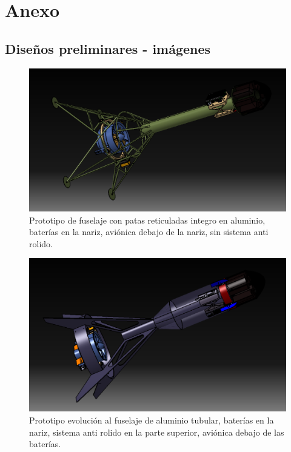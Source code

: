 \null\newpage
\clearpage

\section{Anexo}

\subsection{Diseños preliminares - imágenes}

\begin{figure}[htb]
    \centering
    \includegraphics[height=0.25\pdfpageheight]{fig/design/0}
    \caption{Prototipo de fuselaje con patas reticuladas integro en aluminio, baterías en la nariz, aviónica debajo de la nariz, sin sistema anti rolido.}
    \label{fig:design/0}
\end{figure}


\begin{figure}[htb]
    \centering
    \includegraphics[width=\linewidth]{fig/design/1}
    \caption{Prototipo evolución al fuselaje de aluminio tubular, baterías en la nariz, sistema anti rolido en
    la parte superior, aviónica debajo de las baterías.}
    \label{fig:design/1}
\end{figure}

